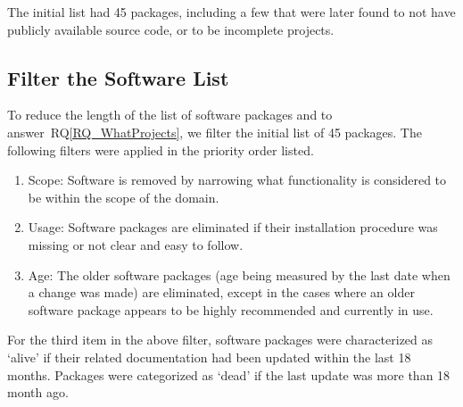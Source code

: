 \documentclass[final, 3p, times, authoryear]{elsarticle}
\newcommand{\rqref}[1]{RQ\ref{#1}}
\begin{document}
The initial list had 45 packages, including a few that were later found to not
have publicly available source code, or to be incomplete projects.

\subsection{Filter the Software List} \label{filtersoftware}

To reduce the length of the list of software packages and to
answer~\rqref{RQ_WhatProjects}, we filter the initial list of 45 packages.  The
following filters were applied in the priority order listed.

\begin{enumerate}
	\item Scope: Software is removed by narrowing what functionality is
	considered to be within the scope of the domain.
	\item Usage: Software packages are eliminated if their installation
	procedure was missing or not clear and easy to follow.
	\item Age: The older software packages (age being measured by the last date
	when a change was made) are eliminated, except in the cases where an older
	software package appears to be highly recommended and currently in use. 
\end{enumerate}

For the third item in the above filter, software packages were characterized as
`alive' if their related documentation had been updated within the last 18
months. Packages were categorized as `dead' if the last update was more than 18
month ago.
\end{document}
